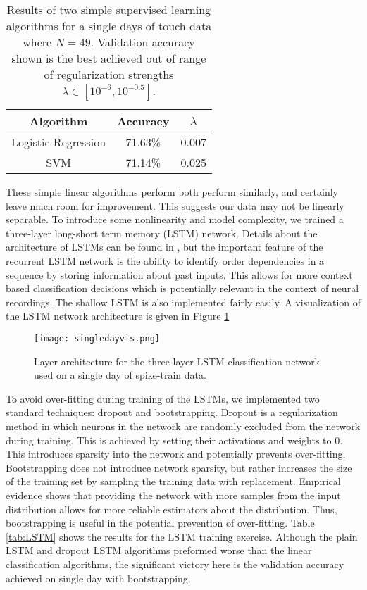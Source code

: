 \documentclass[12pt]{article}
\begin{document}
\begin{table}[]
  \centering
\begin{tabular}{|c|c|c|}
  \hline
                Algorithm    & Accuracy & $\lambda$  \\
                      \hline
Logistic Regression & 71.63\%  & 0.007   \\
  \hline
SVM                 & 71.14\%  & 0.025    \\
  \hline

\end{tabular}
\caption{Results of two simple supervised learning algorithms for a single days of touch data where $N = 49$. Validation accuracy shown is the best achieved out of range of regularization strengths  $\lambda \in [10^{-6},10^{-0.5}]$.}
\label{tab:simp}
\end{table}
These simple linear algorithms perform both perform similarly, and certainly leave much room for improvement. This suggests our data may not be linearly separable. To introduce some nonlinearity and model complexity, we trained a three-layer long-short term memory (LSTM) network. Details about the architecture of LSTMs can be found in \cite{bengio}, but the important feature of the recurrent LSTM network is the ability to identify order dependencies in a sequence by storing information about past inputs. This allows for more context based classification decisions which is potentially relevant in the context of neural recordings. The shallow LSTM is also implemented fairly easily. A visualization of the LSTM network architecture is given in Figure \ref{fig:lstm} \\
\begin{figure}
  \centering
  \texttt{[image: singledayvis.png]}
  \caption{Layer architecture for the three-layer LSTM classification network used on a single day of spike-train data.}
  \label{fig:lstm}
\end{figure}
\indent To avoid over-fitting during training of the LSTMs, we implemented two standard techniques: dropout and bootstrapping. Dropout is a regularization method in which neurons in the network are randomly excluded from the network during training. This is achieved by setting their activations and weights to 0. This introduces sparsity into the network and potentially prevents over-fitting. Bootstrapping does not introduce network sparsity, but rather increases the size of the training set by sampling the training data with replacement. Empirical evidence shows that providing the network with more samples from the input distribution allows for more reliable estimators about the distribution. Thus, bootstrapping is useful in the potential prevention of over-fitting. Table \ref{tab:LSTM} shows the results for the LSTM training exercise. Although the plain LSTM and dropout LSTM algorithms preformed worse than the linear classification algorithms, the significant victory here is the validation accuracy achieved on single day with bootstrapping.
\end{document}
